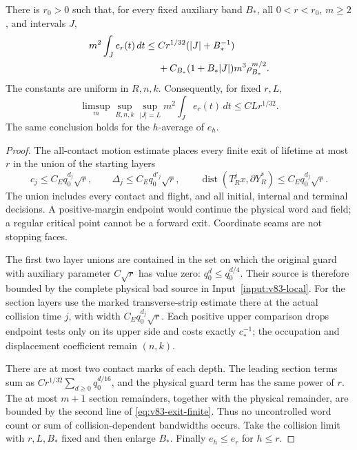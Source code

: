 \begin{theorem}
\label{thm:v83-exit-local-mass}
There is $r_0>0$ such that, for every fixed auxiliary band $B_*$,
all $0<r<r_0$, $m\ge2$, and intervals $J$,
\begin{align}
 m^2\int_J e_r(t)\,dt
 \le{}& C r^{1/32}(|J|+B_*^{-1})\notag\\
 &+C_{B_*}(1+B_*|J|)m^3\rho_{B_*}^{m/2}.
                                      \label{eq:v83-exit-finite}
\end{align}
The constants are uniform in $R,n,k$. Consequently, for fixed $r,L$,
\begin{equation}\label{eq:v83-exit-ordered-mass}
 \limsup_m\sup_{R,n,k}\sup_{|J|=L}m^2\int_J e_r(t)\,dt
                                      \le C Lr^{1/32}.
\end{equation}
The same conclusion holds for the $h$-average of $e_h$.
\end{theorem}
\begin{proof}
The all-contact motion estimate places every finite exit of lifetime
at most $r$ in the union of the starting layers
\[
 c_j\le C_Eq_0^{d_j}\sqrt r,\qquad
 \Delta_j\le C_Eq_0^{d'_j}\sqrt r,\qquad
 \operatorname{dist}(T_R^jx,\partial Y_R^*)
                         \le C_Eq_0^{d_j}\sqrt r.
\]
The union includes every contact and flight, and all initial, internal
and terminal decisions. A positive-margin endpoint would continue
the physical word and field; a regular critical point cannot be a
forward exit. Coordinate seams are not stopping faces.

The first two layer unions are contained in the set on which the
original guard with auxiliary parameter $C\sqrt r$ has value zero:
$q_0^d\le q_0^{d/4}$. Their source is therefore bounded by the
complete physical bad source in Input~\ref{input:v83-local}. For
the section layers use the marked transverse-strip estimate there
at the actual collision time $j$, with width
$C_Eq_0^{d_j}\sqrt r$. Each positive upper comparison drops endpoint
tests only on its upper side and costs exactly $c_*^{-1}$; the
occupation and displacement coefficient remain $(n,k)$.

There are at most two contact marks of each depth. The leading
section terms sum as
$Cr^{1/32}\sum_{d\ge0}q_0^{d/16}$, and the physical guard term
has the same power of $r$. The at most $m+1$ section remainders,
together with the physical remainder, are bounded by the second
line of \eqref{eq:v83-exit-finite}. Thus no uncontrolled word count
or sum of collision-dependent bandwidths occurs. Take the collision
limit with $r,L,B_*$ fixed and then enlarge $B_*$. Finally
$e_h\le e_r$ for $h\le r$.
\end{proof}

